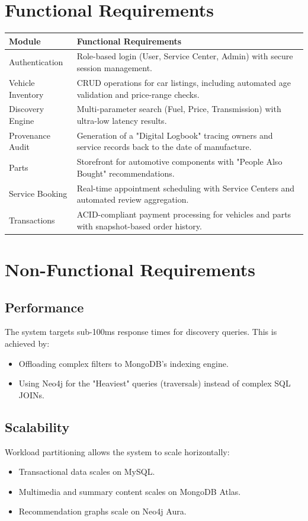 \documentclass[12pt,a4paper]{report}
\begin{document}
\section{Functional Requirements}
\begin{longtable}{p{} p{}}
\toprule
\textbf{Module} & \textbf{Functional Requirements} \\
\midrule
\endhead
Authentication & Role-based login (User, Service Center, Admin) with secure session management. \\
Vehicle Inventory & CRUD operations for car listings, including automated age validation and price-range checks. \\
Discovery Engine & Multi-parameter search (Fuel, Price, Transmission) with ultra-low latency results. \\
Provenance Audit & Generation of a "Digital Logbook" tracing owners and service records back to the date of manufacture. \\
Parts & Storefront for automotive components with "People Also Bought" recommendations. \\
Service Booking & Real-time appointment scheduling with Service Centers and automated review aggregation. \\
Transactions & ACID-compliant payment processing for vehicles and parts with snapshot-based order history. \\
\bottomrule
\end{longtable}

\section{Non-Functional Requirements}
\subsection{Performance}
The system targets sub-100ms response times for discovery queries. This is achieved by:
\begin{itemize}[leftmargin=1.5em]
    \item Offloading complex filters to MongoDB's indexing engine.
    \item Using Neo4j for the "Heaviest" queries (traversals) instead of complex SQL JOINs.
\end{itemize}

\subsection{Scalability}
Workload partitioning allows the system to scale horizontally:
\begin{itemize}[leftmargin=1.5em]
    \item Transactional data scales on MySQL.
    \item Multimedia and summary content scales on MongoDB Atlas.
    \item Recommendation graphs scale on Neo4j Aura.
\end{itemize}
\end{document}
